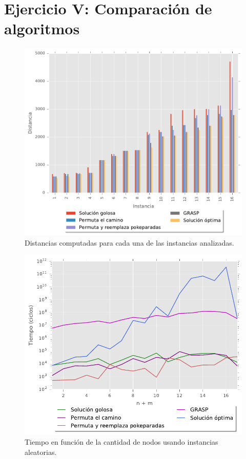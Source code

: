 \section{Ejercicio V: Comparaci\'on de algoritmos}

\begin{figure}[H]
  \begin{center}
    \includegraphics{../experimentacion/ej5/expAleatOp_instancia_distancia.pdf}
    \caption{Distancias computadas para cada una de las instancias analizadas.}
    \label{fig:ej5_expAleatOp_instancia_distancia}
  \end{center}
\end{figure}

\begin{figure}[H]
  \begin{center}
    \includegraphics{../experimentacion/ej5/expAleatOp_cantNodos_tiempo.pdf}
    \caption{Tiempo en funci\'on de la cantidad de nodos usando instancias aleatorias.}
    \label{fig:ej5_expAleatOp_cantNodos_tiempo}
  \end{center}
\end{figure}
